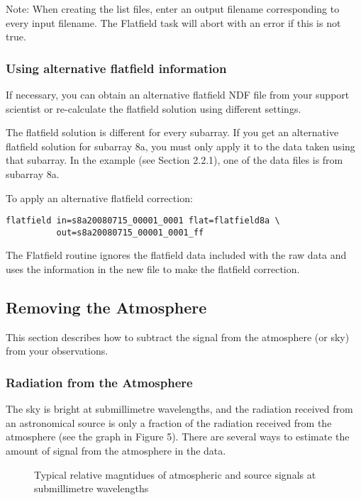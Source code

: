 \documentclass[twoside,11pt]{article}
\renewcommand{\_}{\texttt{\symbol{95}}}
\begin{document}
Note: When creating the list files, enter an output filename
corresponding to every input filename. The Flatfield task will abort
with an error if this is not true.

\subsubsection{Using alternative flatfield information}

If necessary, you can obtain an alternative flatfield NDF file from
your support scientist or re-calculate the flatfield solution using
different settings.

The flatfield solution is different for every subarray. If you get an
alternative flatfield solution for subarray 8a, you must only apply it
to the data taken using that subarray. In the example (see Section
2.2.1), one of the data files is from subarray 8a.

To apply an alternative flatfield correction:
\begin{verbatim}
flatfield in=s8a20080715_00001_0001 flat=flatfield8a \
          out=s8a20080715_00001_0001_ff
\end{verbatim}
The Flatfield routine ignores the flatfield data included with the raw
data and uses the information in the new file to make the flatfield
correction.

\subsection{Removing the Atmosphere}

This section describes how to subtract the signal from the atmosphere
(or sky) from your observations.

\subsubsection{Radiation from the Atmosphere}

The sky is bright at submillimetre wavelengths, and the radiation received from
an astronomical source is only a fraction of the radiation received from the
atmosphere (see the graph in Figure 5). There are several ways to estimate the
amount of signal from the atmosphere in the data.

\begin{figure}
\caption{Typical relative magntidues of atmospheric and source signals
  at submillimetre wavelengths}
\end{figure}
\end{document}
